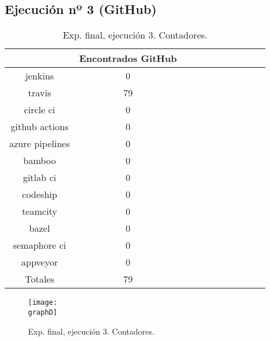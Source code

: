 \newpage

\subsection{Ejecución nº 3 (GitHub)}
\begin{table}[h]
  \centering
  \caption{Exp. final, ejecución 3. Contadores.}
  \label{tab:tabla_f3_1}

\begin{footnotesize}
\renewcommand{\arraystretch}{1.5} %
\begin{tabular}{ccccccccccc}
  \hline
  {} &  Encontrados GitHub \\
  \hline
  jenkins         &                   0 \\
  travis          &                  79 \\
  circle ci       &                   0 \\
  github actions  &                   0 \\
  azure pipelines &                   0 \\
  bamboo          &                   0 \\
  gitlab ci       &                   0 \\
  codeship        &                   0 \\
  teamcity        &                   0 \\
  bazel           &                   0 \\
  semaphore ci    &                   0 \\
  appveyor        &                   0 \\
  \hline
  Totales         &                  79 \\
 \end{tabular}
\end{footnotesize}

\end{table}

\begin{figure}
  \centering
  \texttt{[image: \\graphD]}
  \caption{Exp. final, ejecución 3. Contadores.}
\end{figure}

\newpage

